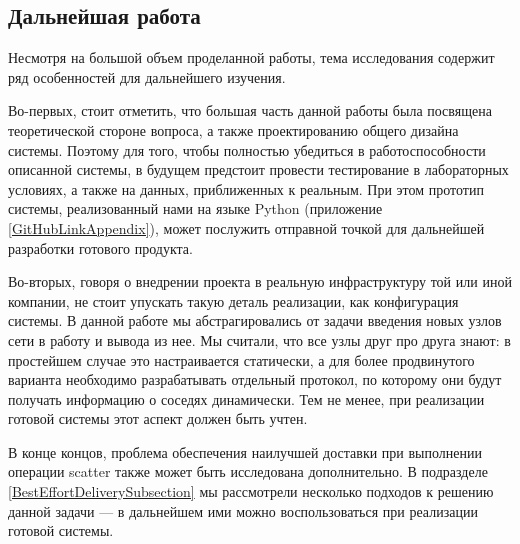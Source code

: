 \documentclass{article}
\theoremstyle{plain}
\theoremstyle{plain}
\theoremstyle{plain}
\theoremstyle{plain}
\theoremstyle{definition}
\theoremstyle{remark}
\theoremstyle{plain}
\begin{document}
\subsection*{Дальнейшая работа}

Несмотря на большой объем проделанной работы, тема исследования содержит ряд особенностей для дальнейшего изучения.

Во-первых, стоит отметить, что большая часть данной работы была посвящена теоретической стороне вопроса, а также проектированию общего дизайна системы. Поэтому для того, чтобы полностью убедиться в работоспособности описанной системы, в будущем предстоит провести тестирование в лабораторных условиях, а также на данных, приближенных к реальным. При этом прототип системы, реализованный нами на языке Python (приложение \ref{GitHubLinkAppendix}), может послужить отправной точкой для дальнейшей разработки готового продукта.

Во-вторых, говоря о внедрении проекта в реальную инфраструктуру той или иной компании, не стоит упускать такую деталь реализации, как конфигурация системы. В данной работе мы абстрагировались от задачи введения новых узлов сети в работу и вывода из нее. Мы считали, что все узлы друг про друга знают: в простейшем случае это настраивается статически, а для более продвинутого варианта необходимо разрабатывать отдельный протокол, по которому они будут получать информацию о соседях динамически. Тем не менее, при реализации готовой системы этот аспект должен быть учтен.

В конце концов, проблема обеспечения наилучшей доставки при выполнении операции scatter также может быть исследована дополнительно. В подразделе \ref{BestEffortDeliverySubsection} мы рассмотрели несколько подходов к решению данной задачи --- в дальнейшем ими можно воспользоваться при реализации готовой системы.


\clearpage



\end{document}
